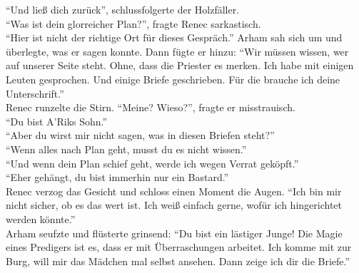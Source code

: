 ``Und ließ dich zurück'', schlussfolgerte der Holzfäller.\\
``Was ist dein glorreicher Plan?'', fragte Renec sarkastisch.\\
``Hier ist nicht der richtige Ort für dieses Gespräch.'' Arham sah sich um und überlegte, was er 
sagen konnte. Dann fügte er hinzu: ``Wir müssen wissen, wer auf unserer Seite steht. Ohne, dass 
die Priester es merken. Ich habe mit einigen Leuten gesprochen. Und einige Briefe geschrieben. Für 
die brauche ich deine Unterschrift.''\\
Renec runzelte die Stirn. ``Meine? Wieso?'', fragte er misstrauisch.\\
``Du bist A'Riks Sohn.''\\
``Aber du wirst mir nicht sagen, was in diesen Briefen steht?''\\
``Wenn alles nach Plan geht, musst du es nicht wissen.''\\
``Und wenn dein Plan schief geht, werde ich wegen Verrat geköpft.''\\
``Eher gehängt, du bist immerhin nur ein Bastard.''\\
Renec verzog das Gesicht und schloss einen Moment die Augen. ``Ich bin mir nicht sicher, ob es das 
wert ist. Ich weiß einfach gerne, wofür ich hingerichtet werden könnte.''\\
Arham seufzte und flüsterte grinsend: ``Du bist ein lästiger Junge! Die Magie eines Predigers ist 
es, dass er mit Überraschungen arbeitet. Ich komme mit zur Burg, will mir das Mädchen mal selbst 
ansehen. Dann zeige ich dir die Briefe.''\\


